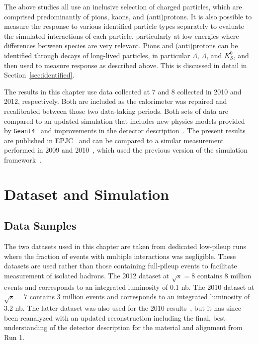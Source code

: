 The above studies all use an inclusive selection of charged particles, which are comprised predominantly of pions, kaons, and (anti)protons.
It is also possible to measure the response to various identified particle types separately to evaluate the simulated interactions of each particle, particularly at low energies where differences between species are very relevant.
Pions and (anti)protons can be identified through decays of long-lived particles, in particular $\Lambda$, $\overline{\Lambda}$, and $K_{S}^{0}$, and then used to measure response as described above.
This is discussed in detail in Section~\ref{sec:identified}.

The results in this chapter use data collected at 7 and 8 \TeV collected in 2010 and 2012, respectively.
Both are included as the calorimeter was repaired and recalibrated between those two data-taking periods.
Both sets of data are compared to an updated simulation that includes new physics models provided by \texttt{Geant4}~\cite{GEANT4} and improvements in the detector description~\cite{PERF-2011-08,PERF-2013-05}.
The present results are published in \ac{EPJC}~\cite{PERF-2015-05} and can be compared to a similar measurement performed in 2009 and 2010~\cite{PERF-2011-05}, which used the previous version of the simulation framework~\cite{SOFT-2010-01}.

\section{Dataset and Simulation}

\subsection{Data Samples}
The two datasets used in this chapter are taken from dedicated low-pileup runs where the fraction of events with multiple interactions was negligible.
These datasets are used rather than those containing full-pileup events to facilitate measurement of isolated hadrons.
The 2012 dataset at $\sqrt{s} = 8$ \TeV contains 8 million events and corresponds to an integrated luminosity of 0.1 nb.
The 2010 dataset at $\sqrt{s} = 7$ \TeV contains 3 million events and corresponds to an integrated luminosity of 3.2 nb.
The latter dataset was also used for the 2010 results~\cite{PERF-2011-05}, but it has since been reanalyzed with an updated reconstruction including the final, best understanding of the detector description for the material and alignment from Run 1.

